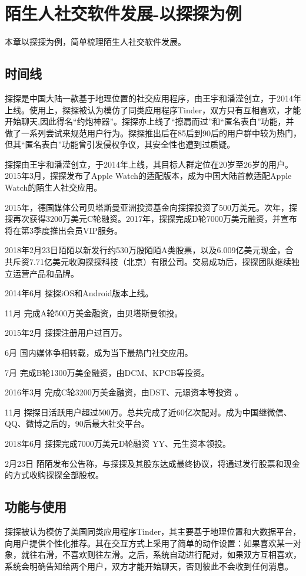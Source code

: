 \documentclass[UTF8]{ctexart}
\begin{document}
\section{陌生人社交软件发展-以探探为例}
本章以探探为例，简单梳理陌生人社交软件发展。

\subsection{时间线}

探探是中国大陆一款基于地理位置的社交应用程序，由王宇和潘滢创立，于2014年上线。使用上，探探被认为模仿了同类应用程序Tinder，双方只有互相喜欢，才能开始聊天,因此得名“约炮神器”。探探亦上线了“擦肩而过”和“匿名表白”功能，并做了一系列尝试来规范用户行为。探探推出后在85后到90后的用户群中较为热门，但其“匿名表白”功能曾引发侵权争议，其安全性也遭到过质疑。

探探由王宇和潘滢创立，于2014年上线，其目标人群定位在20岁至26岁的用户。2015年3月，探探发布了Apple Watch的适配版本，成为中国大陆首款适配Apple Watch的陌生人社交应用。

2015年，德国媒体公司贝塔斯曼亚洲投资基金向探探投资了500万美元。次年，探探再次获得3200万美元C轮融资。2017年，探探完成D轮7000万美元融资，并宣布将在第3季度推出会员VIP服务。

2018年2月23日陌陌以新发行约530万股陌陌A类股票，以及6.009亿美元现金，合共斥资7.71亿美元收购探探科技（北京）有限公司。交易成功后，探探团队继续独立运营产品和品牌。

\begin{tcolorbox}
    2014年6月 探探iOS和Android版本上线。

    11月 完成A轮500万美金融资，由贝塔斯曼领投。

    2015年2月 探探注册用户过百万。

    6月 国内媒体争相转载，成为当下最热门社交应用。

    7月 完成B轮1300万美金融资，由DCM、KPCB等投资。

    2016年3月 完成C轮3200万美金融资，由DST、元璟资本等投资 。

    11月 探探日活跃用户超过500万。总共完成了近60亿次配对。成为中国继微信、QQ、微博之后的，90后最大社交平台。

    2018年6月 探探完成7000万美元D轮融资 YY、元生资本领投。

    2月23日 陌陌发布公告称，与探探及其股东达成最终协议，将通过发行股票和现金的方式收购探探全部股权。\cite{MoMoHistory}
\end{tcolorbox}

\subsection{功能与使用}
探探被认为模仿了美国同类应用程序Tinder，其主要基于地理位置和大数据平台，向用户提供个性化推荐。其在交互方式上采用了简单的动作设置：如果喜欢某一对象，就往右滑，不喜欢则往左滑。之后，系统自动进行配对，如果双方互相喜欢，系统会明确告知给两个用户，双方才能开始聊天，否则彼此不会收到任何消息。
\end{document}
